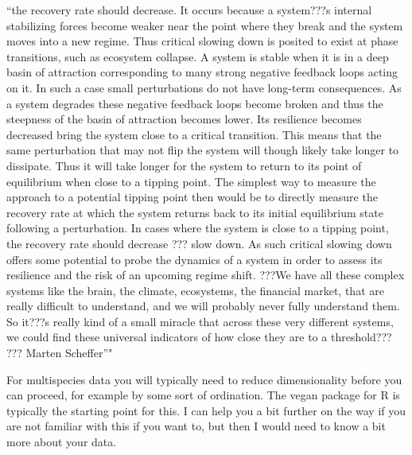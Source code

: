 \documentclass[12pt,twoside,openany]{reedthesis}
\begin{document}
``the recovery rate should decrease. It occurs because a system???s
internal stabilizing forces become weaker near the point where they
break and the system moves into a new regime. Thus critical slowing down
is posited to exist at phase transitions, such as ecosystem collapse. A
system is stable when it is in a deep basin of attraction corresponding
to many strong negative feedback loops acting on it. In such a case
small perturbations do not have long-term consequences. As a system
degrades these negative feedback loops become broken and thus the
steepness of the basin of attraction becomes lower. Its resilience
becomes decreased bring the system close to a critical transition. This
means that the same perturbation that may not flip the system will
though likely take longer to dissipate. Thus it will take longer for the
system to return to its point of equilibrium when close to a tipping
point. The simplest way to measure the approach to a potential tipping
point then would be to directly measure the recovery rate at which the
system returns back to its initial equilibrium state following a
perturbation. In cases where the system is close to a tipping point, the
recovery rate should decrease ??? slow down. As such critical slowing
down offers some potential to probe the dynamics of a system in order to
assess its resilience and the risk of an upcoming regime shift. ???We
have all these complex systems like the brain, the climate, ecosystems,
the financial market, that are really difficult to understand, and we
will probably never fully understand them. So it???s really kind of a
small miracle that across these very different systems, we could find
these universal indicators of how close they are to a threshold??? ???
Marten Scheffer''"

For multispecies data you will typically need to reduce dimensionality
before you can proceed, for example by some sort of ordination. The
vegan package for R is typically the starting point for this. I can help
you a bit further on the way if you are not familiar with this if you
want to, but then I would need to know a bit more about your data.
\end{document}
